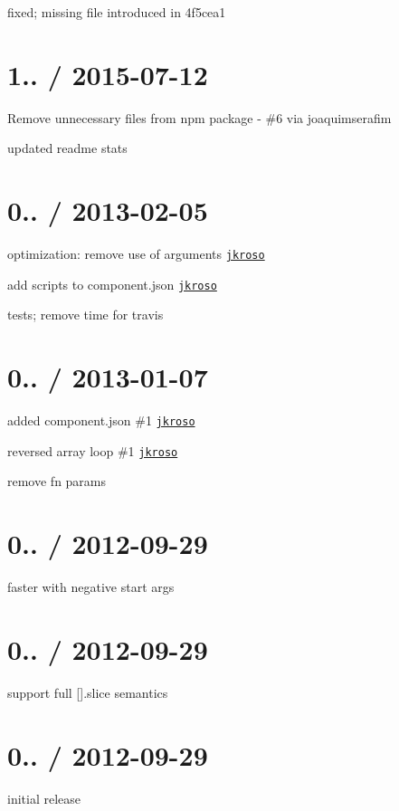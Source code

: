 
\begin{DoxyItemize}
\item fixed; missing file introduced in 4f5cea1
\end{DoxyItemize}

\section*{1.. / 2015-\/07-\/12 }


\begin{DoxyItemize}
\item Remove unnecessary files from npm package -\/ \#6 via joaquimserafim
\item updated readme stats
\end{DoxyItemize}

\section*{0.. / 2013-\/02-\/05 }


\begin{DoxyItemize}
\item optimization\+: remove use of arguments \href{https://github.com/jkroso}{\tt jkroso}
\item add scripts to component.\+json \href{https://github.com/jkroso}{\tt jkroso}
\item tests; remove time for travis
\end{DoxyItemize}

\section*{0.. / 2013-\/01-\/07 }


\begin{DoxyItemize}
\item added component.\+json \#1 \href{https://github.com/jkroso}{\tt jkroso}
\item reversed array loop \#1 \href{https://github.com/jkroso}{\tt jkroso}
\item remove fn params
\end{DoxyItemize}

\section*{0.. / 2012-\/09-\/29 }


\begin{DoxyItemize}
\item faster with negative start args
\end{DoxyItemize}

\section*{0.. / 2012-\/09-\/29 }


\begin{DoxyItemize}
\item support full \mbox{[}\mbox{]}.slice semantics
\end{DoxyItemize}

\section*{0.. / 2012-\/09-\/29 }


\begin{DoxyItemize}
\item initial release 
\end{DoxyItemize}
